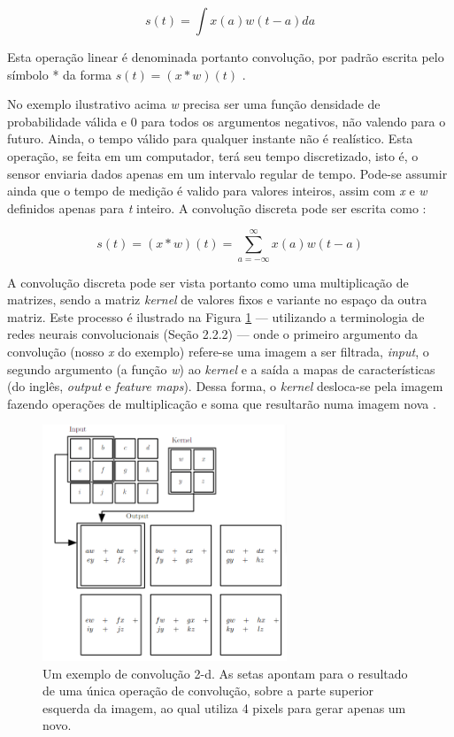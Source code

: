 \documentclass[12pt]{report}
\newcommand*{\captionsource}[2]{%
  \caption[{#1}]{%
    #1%
    \\\hspace{\linewidth}%
     \text{Fonte:}#2%
  }%
}
\begin{document}
\begin{equation}
    s(t) = \int x(a)w(t - a)da
\end{equation}

Esta operação linear é denominada portanto convolução, por padrão escrita pelo símbolo * da forma $s(t) = (x * w) (t)$ \cite{Goodfellow}.

No exemplo ilustrativo acima \textit{w} precisa ser uma função densidade de probabilidade válida e 0 para todos os argumentos negativos, não valendo para o futuro. Ainda, o tempo válido para qualquer instante não é realístico. Esta operação, se feita em um computador, terá seu tempo discretizado, isto é, o sensor enviaria dados apenas em um intervalo regular de tempo. Pode-se assumir ainda que o tempo de medição é valido para valores inteiros, assim com \textit{x} e \textit{w} definidos apenas para \textit{t} inteiro. A convolução discreta pode ser escrita como \cite{Goodfellow}:

\begin{equation}
    s(t) = (x*w)(t) = \sum_{a = -\infty}^\infty x(a)w(t - a)
\end{equation}

A convolução discreta pode ser vista portanto como uma multiplicação de matrizes, sendo a matriz \textit{kernel} de valores fixos e variante no espaço da outra matriz. Este processo é ilustrado na Figura \ref{fig:convo} --- utilizando a terminologia de redes neurais convolucionais (Seção 2.2.2) --- onde o primeiro argumento da convolução (nosso \textit{x} do exemplo) refere-se uma imagem a ser filtrada, \textit{input}, o segundo argumento (a função \textit{w}) ao \textit{kernel} e a saída a mapas de características (do inglês, \textit{output} e \textit{feature maps}). Dessa forma, o \textit{kernel} desloca-se pela imagem fazendo operações de multiplicação e soma que resultarão numa imagem nova  \cite{Goodfellow}.

\begin{figure}
    \centering
    \includegraphics[width=0.65\textwidth]{images/convo.png}
    \captionsource{Um exemplo de convolução 2-d. As setas apontam para o resultado de uma única operação de convolução, sobre a parte superior esquerda da imagem, ao qual utiliza 4 pixels para gerar apenas um novo.}{ \protect\cite{Goodfellow}}
    \label{fig:convo}
\end{figure}
\end{document}
